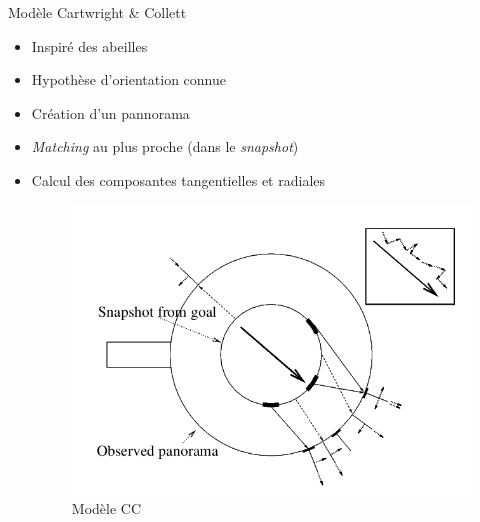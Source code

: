 \documentclass{beamer}
\begin{document}
\begin{frame}
  \begin{block}{Modèle Cartwright \& Collett \cite{Carwright1983}}
    \begin{itemize}
      \item Inspiré des abeilles
      \item Hypothèse d'orientation connue
      \item Création d'un pannorama
      \item \textit{Matching} au plus proche (dans le \textit{snapshot})
      \item Calcul des composantes tangentielles et radiales    
      \begin{figure}
        \centering
        \includegraphics[scale=0.2]{cc_model.png}
        \caption{Modèle CC}
      \end{figure}
    \end{itemize}
  \end{block}
\end{frame}
\end{document}
